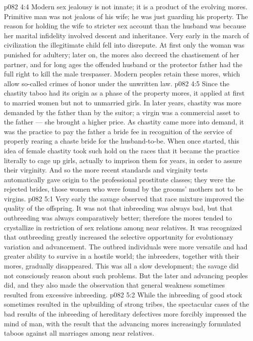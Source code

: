 \vs p082 4:4 Modern sex jealousy is not innate; it is a product of the evolving mores. Primitive man was not jealous of his wife; he was just guarding his property. The reason for holding the wife to stricter sex account than the husband was because her marital infidelity involved descent and inheritance. Very early in the march of civilization the illegitimate child fell into disrepute. At first only the woman was punished for adultery; later on, the mores also decreed the chastisement of her partner, and for long ages the offended husband or the protector father had the full right to kill the male trespasser. Modern peoples retain these mores, which allow so\hyp{}called crimes of honor under the unwritten law.
\vs p082 4:5 Since the chastity taboo had its origin as a phase of the property mores, it applied at first to married women but not to unmarried girls. In later years, chastity was more demanded by the father than by the suitor; a virgin was a commercial asset to the father --- she brought a higher price. As chastity came more into demand, it was the practice to pay the father a bride fee in recognition of the service of properly rearing a chaste bride for the husband\hyp{}to\hyp{}be. When once started, this idea of female chastity took such hold on the races that it became the practice literally to cage up girls, actually to imprison them for years, in order to assure their virginity. And so the more recent standards and virginity tests automatically gave origin to the professional prostitute classes; they were the rejected brides, those women who were found by the grooms’ mothers not to be virgins.
\vs p082 5:1 Very early the savage observed that race mixture improved the quality of the offspring. It was not that inbreeding was always bad, but that outbreeding was always comparatively better; therefore the mores tended to crystallize in restriction of sex relations among near relatives. It was recognized that outbreeding greatly increased the selective opportunity for evolutionary variation and advancement. The outbred individuals were more versatile and had greater ability to survive in a hostile world; the inbreeders, together with their mores, gradually disappeared. This was all a slow development; the savage did not consciously reason about such problems. But the later and advancing peoples did, and they also made the observation that general weakness sometimes resulted from excessive inbreeding.
\vs p082 5:2 While the inbreeding of good stock sometimes resulted in the upbuilding of strong tribes, the spectacular cases of the bad results of the inbreeding of hereditary defectives more forcibly impressed the mind of man, with the result that the advancing mores increasingly formulated taboos against all marriages among near relatives.
